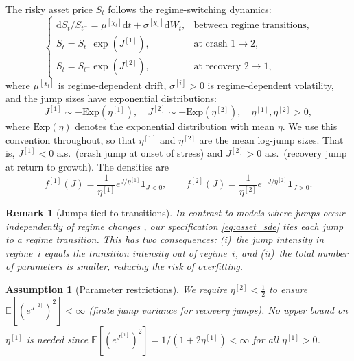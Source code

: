 \documentclass[11pt,a4paper]{article}
\numberwithin{equation}{section}
\newtheorem{remark}[theorem]{Remark}
\newtheorem{assumption}[theorem]{Assumption}
\newcommand{\E}{\mathbb{E}}
\newcommand{\dd}{\mathrm{d}}
\newcommand{\ind}{\mathbf{1}}
\begin{document}
The risky asset price $S_t$ follows the regime-switching dynamics:
\begin{equation}\label{eq:asset_sde}
\begin{cases}
\dd S_t / S_{t^-} = \mu^{[\chi_t]} \dd t + \sigma^{[\chi_t]} \dd W_t, & \text{between regime transitions,} \\[4pt]
S_t = S_{t^-} \exp(J^{[1]}), & \text{at crash } 1 \to 2, \\[4pt]
S_t = S_{t^-} \exp(J^{[2]}), & \text{at recovery } 2 \to 1,
\end{cases}
\end{equation}
where $\mu^{[\chi_t]}$ is regime-dependent drift, $\sigma^{[i]} > 0$ is regime-dependent volatility, and the jump sizes have exponential distributions:
\begin{equation}\label{eq:jump_dist}
J^{[1]} \sim -\mathrm{Exp}(\eta^{[1]}), \quad J^{[2]} \sim +\mathrm{Exp}(\eta^{[2]}), \quad \eta^{[1]}, \eta^{[2]} > 0,
\end{equation}
where $\mathrm{Exp}(\eta)$ denotes the exponential distribution with mean $\eta$. We use this convention throughout, so that $\eta^{[1]}$ and $\eta^{[2]}$ are the mean log-jump sizes. That is, $J^{[1]} < 0$ a.s.\ (crash jump at onset of stress) and $J^{[2]} > 0$ a.s.\ (recovery jump at return to growth). The densities are
\begin{equation}\label{eq:jump_pdf}
f^{[1]}(J) = \frac{1}{\eta^{[1]}} e^{J/\eta^{[1]}} \ind_{J < 0}, \qquad f^{[2]}(J) = \frac{1}{\eta^{[2]}} e^{-J/\eta^{[2]}} \ind_{J > 0}.
\end{equation}

\begin{remark}[Jumps tied to transitions]\label{rem:jump_tied}
In contrast to models where jumps occur independently of regime changes \citep[e.g.,][]{ShiXu2025}, our specification \eqref{eq:asset_sde} ties each jump to a regime transition. This has two consequences: (i)~the jump intensity in regime~$i$ equals the transition intensity out of regime~$i$, and (ii)~the total number of parameters is smaller, reducing the risk of overfitting.
\end{remark}

\begin{assumption}[Parameter restrictions]\label{ass:params}
We require $\eta^{[2]} < \tfrac{1}{2}$ to ensure $\E[(e^{J^{[2]}})^2] < \infty$ (finite jump variance for recovery jumps). No upper bound on $\eta^{[1]}$ is needed since $\E[(e^{J^{[1]}})^2] = 1/(1+2\eta^{[1]}) < \infty$ for all $\eta^{[1]} > 0$.
\end{assumption}
\end{document}
